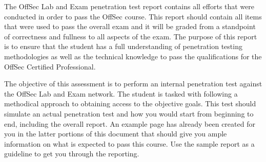
The OffSec Lab and Exam penetration test report contains all efforts that were conducted in order to pass the OffSec course. This report should contain all items that were used to pass the overall exam and it will be graded from a standpoint of correctness and fullness to all aspects of the exam. The purpose of this report is to ensure that the student has a full understanding of penetration testing methodologies as well as the technical knowledge to pass the qualifications for the OffSec Certified Professional. 

\hfill \break
\noindent

The objective of this assessment is to perform an internal penetration test against the OffSec Lab and Exam network. The student is tasked with following a methodical approach to obtaining access to the objective goals. This test should simulate an actual penetration test and how you would start from beginning to end, including the overall report. An example page has already been created for you in the latter portions of this document that should give you ample information on what is expected to pass this course. Use the sample report as a guideline to get you through the reporting.